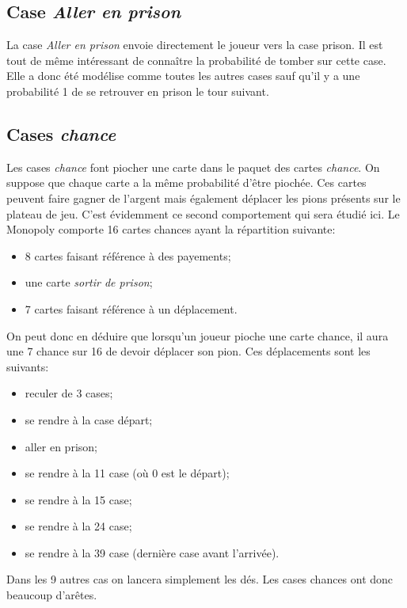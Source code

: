 \documentclass[letterpaper]{article}
\begin{document}
  \subsection{Case \textit{Aller en prison}}
    \label{aller_en_prison}
    La case \textit{Aller en prison} envoie directement le joueur vers
    la case prison.  Il est tout de même intéressant de connaître la
    probabilité de tomber sur cette case.  Elle a donc été modélise
    comme toutes les autres cases sauf qu'il y a une probabilité 1
    de se retrouver en prison le tour suivant.

  \subsection{Cases \textit{chance}}
    Les cases \textit{chance} font piocher une carte dans le paquet des
    cartes \textit{chance}.  On suppose que chaque carte a la
    même probabilité d'être piochée. Ces cartes peuvent faire gagner de
    l'argent mais également déplacer les pions présents sur le plateau
    de jeu.  C'est évidemment ce second comportement qui sera étudié
    ici.  Le Monopoly comporte 16 cartes chances ayant la répartition
    suivante:
    \begin{itemize}
     \item 8 cartes faisant référence à des payements;
     \item une carte \textit{sortir de prison};
     \item 7 cartes faisant référence à un déplacement.
    \end{itemize}
    On peut donc en déduire que lorsqu'un joueur pioche une carte
    chance, il aura une 7 chance sur 16 de devoir déplacer son pion.
    Ces déplacements sont les suivants:
    \begin{itemize}
     \item reculer de 3 cases;
     \item se rendre à la case départ;
     \item aller en prison;
     \item se rendre à la 11 case (où 0 est le départ);
     \item se rendre à la 15 case;
     \item se rendre à la 24 case;
     \item se rendre à la 39 case (dernière case avant l'arrivée).
    \end{itemize}
    Dans les 9 autres cas on lancera simplement les dés.  Les cases
    chances ont donc beaucoup d'arêtes.
\end{document}
